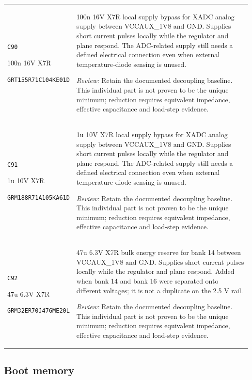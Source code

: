 \documentclass[10pt,a4paper]{article}
\begin{document}
\begin{longtable}{@{}P{46mm}P{117mm}@{}}
\nolinkurl{C90}\par 100n 16V X7R\par\scriptsize \nolinkurl{GRT155R71C104KE01D} & 100n 16V X7R local supply bypass for XADC analog supply between VCCAUX\_1V8 and GND. Supplies short current pulses locally while the regulator and plane respond. The ADC-related supply still needs a defined electrical connection even when external temperature-diode sensing is unused.\par\smallskip\textit{Review:} Retain the documented decoupling baseline. This individual part is not proven to be the unique minimum; reduction requires equivalent impedance, effective capacitance and load-step evidence. \\
\nolinkurl{C91}\par 1u 10V X7R\par\scriptsize \nolinkurl{GRM188R71A105KA61D} & 1u 10V X7R local supply bypass for XADC analog supply between VCCAUX\_1V8 and GND. Supplies short current pulses locally while the regulator and plane respond. The ADC-related supply still needs a defined electrical connection even when external temperature-diode sensing is unused.\par\smallskip\textit{Review:} Retain the documented decoupling baseline. This individual part is not proven to be the unique minimum; reduction requires equivalent impedance, effective capacitance and load-step evidence. \\
\nolinkurl{C92}\par 47u 6.3V X7R\par\scriptsize \nolinkurl{GRM32ER70J476ME20L} & 47u 6.3V X7R bulk energy reserve for bank 14 between VCCAUX\_1V8 and GND. Supplies short current pulses locally while the regulator and plane respond. Added when bank 14 and bank 16 were separated onto different voltages; it is not a duplicate on the 2.5 V rail.\par\smallskip\textit{Review:} Retain the documented decoupling baseline. This individual part is not proven to be the unique minimum; reduction requires equivalent impedance, effective capacitance and load-step evidence. \\
\end{longtable}\endgroup

\Needspace{35mm}\subsection{Boot memory}
\end{document}
